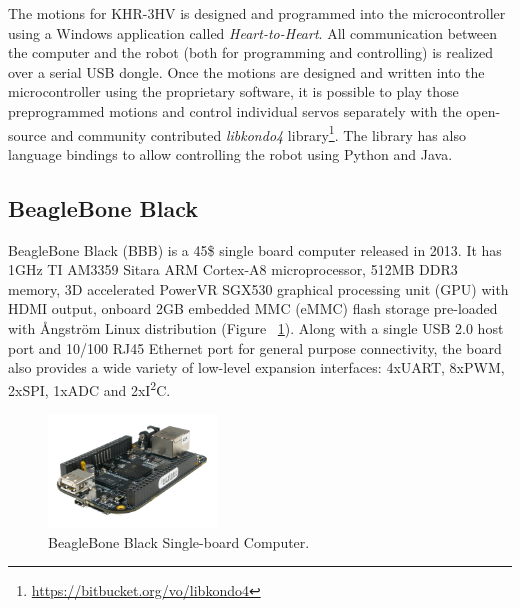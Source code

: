 \documentclass[12pt]{article}
\newcommand\mysubsection[1]{\subsection{#1}}
\numberwithin{equation}{section}
\numberwithin{figure}{section}
\numberwithin{table}{section}
\begin{document}
\par{
    The motions for KHR-3HV is designed and programmed into the microcontroller
    using a Windows application called \emph{Heart-to-Heart}. All communication
    between the computer and the robot (both for programming and controlling)
    is realized over a serial USB dongle. Once the motions are designed and written
    into the microcontroller using the proprietary software,
    it is possible to play those preprogrammed motions and
    control individual servos separately with the open-source and community
    contributed \emph{libkondo4} library\footnote{\url{https://bitbucket.org/vo/libkondo4}}.
    The library has also language bindings to allow controlling the robot using Python and Java.
}

\mysubsection{BeagleBone Black}\label{seq:embeddedcomputer_bbb}

\par{
BeagleBone Black (BBB) is a 45\$ single board computer released in 2013. It has 1GHz TI AM3359 Sitara ARM Cortex-A8 microprocessor,
512MB DDR3 memory, 3D accelerated PowerVR SGX530 graphical processing unit (GPU) with HDMI output, onboard 2GB embedded MMC (eMMC)
flash storage pre-loaded with Ångström Linux distribution (Figure ~\ref{fig:bbb}). Along with a single USB 2.0 host port and 10/100 RJ45 Ethernet port for
general purpose connectivity, the board also provides a wide variety of low-level expansion interfaces:
4xUART, 8xPWM, 2xSPI, 1xADC and 2xI\textsuperscript{2}C.
}

\begin{figure}[ht]
    \centering
    \includegraphics[width=0.4\textwidth]{images/bbb}
    \caption{BeagleBone Black Single-board Computer.}
    \label{fig:bbb}
\end{figure}
\end{document}
